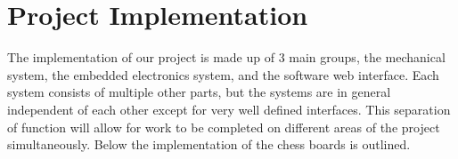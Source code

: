 \documentclass{article}
\begin{document}

\section*{Project Implementation}
\indent

The implementation of our project is made up of 3 main groups, the mechanical system, the embedded electronics system, and the software web interface. Each system consists of multiple other parts, but the systems are in general independent of each other except for very well defined interfaces. This separation of function will allow for work to be completed on different areas of the project simultaneously. Below the implementation of the chess boards is outlined.\\
\end{document}
